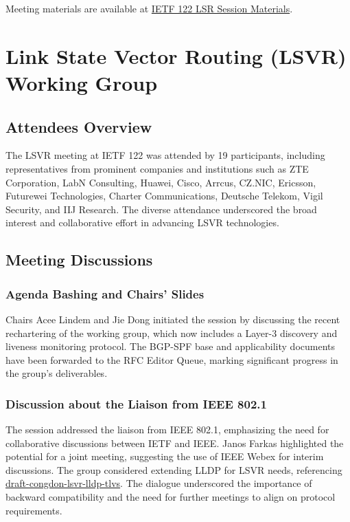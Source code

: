 \documentclass{article}
\begin{document}
Meeting materials are available at \href{https://datatracker.ietf.org/meeting/122/session/lsr}{IETF 122 LSR Session Materials}.




\newpage

\section{Link State Vector Routing (LSVR) Working Group}

\subsection{Attendees Overview}
The LSVR meeting at IETF 122 was attended by 19 participants, including representatives from prominent companies and institutions such as ZTE Corporation, LabN Consulting, Huawei, Cisco, Arrcus, CZ.NIC, Ericsson, Futurewei Technologies, Charter Communications, Deutsche Telekom, Vigil Security, and IIJ Research. The diverse attendance underscored the broad interest and collaborative effort in advancing LSVR technologies.

\subsection{Meeting Discussions}

\subsubsection{Agenda Bashing and Chairs' Slides}
Chairs Acee Lindem and Jie Dong initiated the session by discussing the recent rechartering of the working group, which now includes a Layer-3 discovery and liveness monitoring protocol. The BGP-SPF base and applicability documents have been forwarded to the RFC Editor Queue, marking significant progress in the group's deliverables.

\subsubsection{Discussion about the Liaison from IEEE 802.1}
The session addressed the liaison from IEEE 802.1, emphasizing the need for collaborative discussions between IETF and IEEE. Janos Farkas highlighted the potential for a joint meeting, suggesting the use of IEEE Webex for interim discussions. The group considered extending LLDP for LSVR needs, referencing \href{https://datatracker.ietf.org/doc/html/draft-congdon-lsvr-lldp-tlvs}{draft-congdon-lsvr-lldp-tlvs}. The dialogue underscored the importance of backward compatibility and the need for further meetings to align on protocol requirements.
\end{document}
